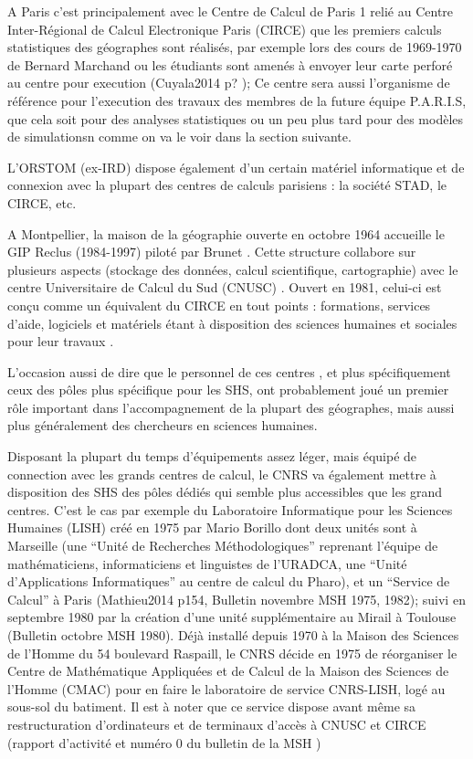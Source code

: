 A Paris c’est principalement avec le Centre de Calcul de Paris 1 relié au Centre Inter-Régional de Calcul Electronique Paris (CIRCE) que les premiers calculs statistiques des géographes sont réalisés, par exemple lors des cours de 1969-1970 de Bernard Marchand ou les étudiants sont amenés à envoyer leur carte perforé au centre pour execution (Cuyala2014 p? ); Ce centre sera aussi l’organisme de référence pour l’execution des travaux des membres de la future équipe P.A.R.I.S, que cela soit pour des analyses statistiques ou un peu plus tard pour des modèles de simulationsn comme on va le voir dans la section suivante. 

L’ORSTOM (ex-IRD) dispose également d’un certain matériel informatique et de connexion avec la plupart des centres de calculs parisiens : la société STAD, le CIRCE, etc. \autocite{Dejardin1992}

A Montpellier, la maison de la géographie ouverte en octobre 1964 accueille le GIP Reclus (1984-1997) piloté par Brunet \autocite{Brunet1988}. Cette structure collabore sur plusieurs aspects (stockage des données, calcul scientifique, cartographie) avec le centre Universitaire de Calcul du Sud (CNUSC) \autocite{Waniez2010}. Ouvert en 1981, celui-ci est conçu comme un équivalent du CIRCE en tout points : formations, services d’aide, logiciels et matériels étant à disposition des sciences humaines et sociales pour leur travaux  .

L’occasion aussi de dire que le personnel de ces centres , et plus spécifiquement ceux des pôles plus spécifique pour les SHS, ont probablement joué un premier rôle important dans l’accompagnement de la plupart des géographes, mais aussi plus généralement des chercheurs en sciences humaines.

Disposant la plupart du temps d'équipements assez léger, mais équipé de connection avec les grands centres de calcul, le CNRS va également mettre à disposition des SHS des pôles dédiés qui semble plus accessibles que les grand centres. C’est le cas par exemple du Laboratoire Informatique pour les Sciences Humaines (LISH) \autocite{MSH1975} créé en 1975 par Mario Borillo dont deux unités sont à Marseille (une \enquote{Unité de Recherches Méthodologiques} reprenant l'équipe de mathématiciens, informaticiens et linguistes de l'URADCA, une \enquote{Unité d’Applications Informatiques} au centre de calcul du Pharo), et un \enquote{Service de Calcul} à Paris (Mathieu2014 p154, Bulletin novembre MSH 1975, 1982); suivi en septembre 1980 par la création d’une unité supplémentaire au Mirail à Toulouse (Bulletin octobre MSH 1980). Déjà installé depuis 1970 à la Maison des Sciences de l'Homme du 54 boulevard Raspaill, le CNRS décide en 1975 de réorganiser le Centre de Mathématique Appliquées et de Calcul de la Maison des Sciences de l’Homme (CMAC) pour en faire le laboratoire de service CNRS-LISH, logé au sous-sol du batiment. Il est à noter que ce service dispose avant même sa restructuration d’ordinateurs et de terminaux d’accès à CNUSC et CIRCE (rapport d’activité \autocite{CNRS1972} et numéro 0 du bulletin de la MSH \autocite{MSH1973})

